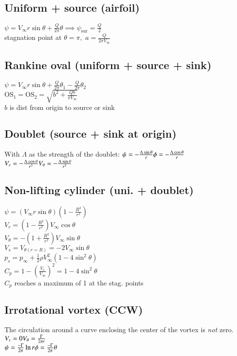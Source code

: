 \subsection*{Uniform + source (airfoil)}
$\psi=V_\infty r\sin\theta+\frac{Q}{2\pi}\theta\implies\psi_\text{sur}=\frac{Q}{2}$\\
stagnation point at $\theta=\pi,\,\,a=\frac{Q}{2\pi V_\infty}$
\subsection*{Rankine oval (uniform + source + sink)}
$\psi=V_\infty r\sin\theta+\frac{Q}{2\pi}\theta_1-\frac{Q}{2\pi}\theta_2$\\
$\text{OS}_1=\text{OS}_2=\sqrt{b^2+\frac{Qb}{\pi V_\infty}}$\\
$b$ is dist from origin to source or sink
\subsection*{Doublet (source + sink at origin)}
With $\Lambda$ as the strength of the doublet:
$\psi=-\frac{\Lambda\sin\theta}{r}\hfill \phi=-\frac{\Lambda\cos\theta}{r}$\\
$V_r=-\frac{\Lambda\cos\theta}{r^2}\hfill V_\theta=-\frac{\Lambda\sin\theta}{r^2}$
\subsection*{Non-lifting cylinder (uni. + doublet)}
$\psi=\left(V_\infty r\sin\theta\right)\left(1-\frac{R^2}{r^2}\right)$\\
$V_r=\left(1-\frac{R^2}{r^2}\right)V_\infty\cos\theta$\\
$V_\theta=-\left(1+\frac{R^2}{r^2}\right)V_\infty\sin\theta$\\
$V_s=V_{\theta(r=R)}=-2V_\infty\sin\theta$\\
$p_s=p_\infty+\frac{1}{2}\rho V_\infty^2(1-4\sin^2\theta)$\\
$C_p=1-\left(\frac{V_s}{V_\infty}\right)^2=1-4\sin^2\theta$\\
$C_p$ reaches a maximum of 1 at the stag. points
\subsection*{Irrotational vortex (CCW)}
The circulation around a curve enclosing the center of the vortex is \textit{not} zero.\\
$V_r=0\hfill V_\theta=\frac{\Gamma}{2\pi r}$\\
$\psi=\frac{-\Gamma}{2\pi}\ln r\hfill \phi=\frac{-\Gamma}{2\pi}\theta$
